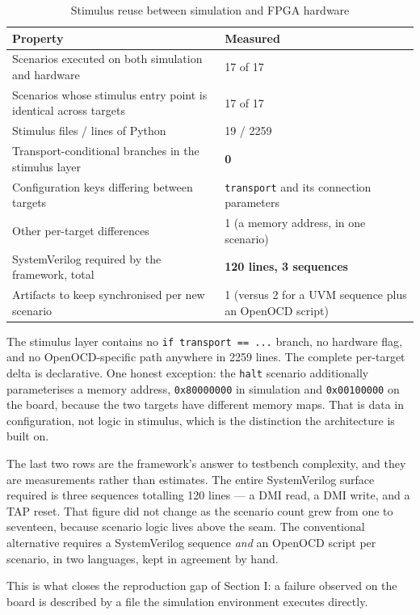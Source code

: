 \documentclass[conference]{IEEEtran}
\begin{document}
\begin{table}[!t]
\caption{Stimulus reuse between simulation and FPGA hardware}
\label{tab:IV}
\centering
\footnotesize
\begin{tabular}{p{}p{}}
\toprule
Property & Measured \\
\midrule
Scenarios executed on both simulation and hardware & 17 of 17 \\
Scenarios whose stimulus entry point is identical across targets & 17 of 17 \\
Stimulus files / lines of Python & 19 / 2259 \\
Transport-conditional branches in the stimulus layer & \textbf{0} \\
Configuration keys differing between targets & \texttt{transport} and its connection parameters \\
Other per-target differences & 1 (a memory address, in one scenario) \\
SystemVerilog required by the framework, total & \textbf{120 lines, 3 sequences} \\
Artifacts to keep synchronised per new scenario & 1 (versus 2 for a UVM sequence plus an OpenOCD script) \\
\bottomrule
\end{tabular}
\end{table}

The stimulus layer contains no \texttt{if transport == ...} branch, no hardware flag, and no OpenOCD-specific path anywhere in 2259 lines. The complete per-target delta is declarative. One honest exception: the \texttt{halt} scenario additionally parameterises a memory address, \texttt{0x80000000} in simulation and \texttt{0x00100000} on the board, because the two targets have different memory maps. That is data in configuration, not logic in stimulus, which is the distinction the architecture is built on.

The last two rows are the framework's answer to testbench complexity, and they are measurements rather than estimates. The entire SystemVerilog surface required is three sequences totalling 120 lines --- a DMI read, a DMI write, and a TAP reset. That figure did not change as the scenario count grew from one to seventeen, because scenario logic lives above the seam. The conventional alternative requires a SystemVerilog sequence \textit{and} an OpenOCD script per scenario, in two languages, kept in agreement by hand.

This is what closes the reproduction gap of Section I: a failure observed on the board is described by a file the simulation environment executes directly.
\end{document}
